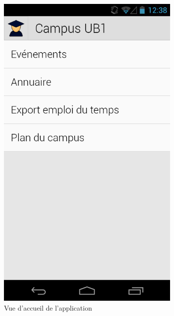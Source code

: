 \documentclass [pdftex,12pt] {report}
\begin{document}
\begin{figure}
\begin{minipage}[t]{8cm}
    \includegraphics[width=0.8\textwidth]{resources/ui_preview/02}
    \caption{Vue d'accueil de l'application}
    \label{fig:02}
  \end{minipage}
  \hspace{-60pt}
\end{figure}
\end{document}
